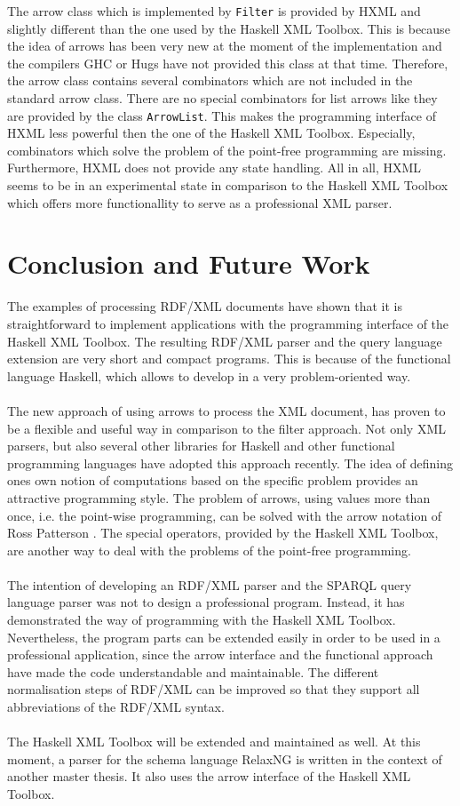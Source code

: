 \documentclass[11pt,a4paper,headsepline, bibtotoc]{scrreprt}
\begin{document}
The arrow class which is implemented by \texttt{Filter} is provided by HXML and slightly different than the one used by the Haskell XML Toolbox. This is because the idea of arrows has been very new at the moment of the implementation and the compilers GHC or Hugs \cite{HUGS} have not provided this class at that time. Therefore, the arrow class contains several combinators which are not included in the standard arrow class. There are no special combinators for list arrows like they are provided by the class \texttt{ArrowList}. This makes the programming interface of HXML less powerful then the one of the Haskell XML Toolbox. Especially, combinators which solve the problem of the point-free programming are missing. Furthermore, HXML does not provide any state handling. All in all, HXML seems to be in an experimental state in comparison to the Haskell XML Toolbox which offers more functionallity to serve as a professional XML parser.
 
\section{Conclusion and Future Work}
The examples of processing RDF/XML documents have shown that it is straightforward to implement applications with the programming interface of the Haskell XML Toolbox. The resulting RDF/XML parser and the query language extension are very short and compact programs. This is because of the functional language Haskell, which allows to develop in a very problem-oriented way.\\
\\
The new approach of using arrows to process the XML document, has proven to be a flexible and useful way in comparison to the filter approach. Not only XML parsers, but also several other libraries for Haskell and other functional programming languages have adopted this approach recently. The idea of defining ones own notion of computations based on the specific problem provides an attractive programming style. The problem of arrows, using values more than once, i.e. the point-wise programming, can be solved with the arrow notation of Ross Patterson \cite{Pat:2001}. The special operators, provided by the Haskell XML Toolbox, are another way to deal with the problems of the point-free programming.\\
\\
The intention of developing an RDF/XML parser and the SPARQL query language parser was not to design a professional program. Instead, it has demonstrated the way of programming with the Haskell XML Toolbox. Nevertheless, the program parts can be extended easily in order to be used in a professional application, since the arrow interface and the functional approach have made the code understandable and maintainable. The different normalisation steps of RDF/XML can be improved so that they support all abbreviations of the RDF/XML syntax.\\
\\
The Haskell XML Toolbox will be extended and maintained as well. At this moment, a parser for the schema language RelaxNG is written in the context of another master thesis. It also uses the arrow interface of the Haskell XML Toolbox.
\end{document}
